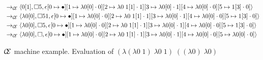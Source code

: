 \begin{figure}
\begin{align*}
&\rightarrow_{\mathcal{\mathcal{C} \mskip -4mu \mathcal{E}}}\langle 0[1],\square 5,\epsilon[0\mapsto\bullet][1\mapsto\lambda0[0]\cdot0][2\mapsto\lambda0\;1[1]\cdot1][3\mapsto\lambda0[0]\cdot1][4\mapsto\lambda0[0]\cdot0][5\mapsto1[3]\cdot0]\rangle\\ 
&\rightarrow_{\mathcal{\mathcal{C} \mskip -4mu \mathcal{E}}}\langle \lambda0[0],\square 5 1,\epsilon[0\mapsto\bullet][1\mapsto\lambda0[0]\cdot0][2\mapsto\lambda0\;1[1]\cdot1][3\mapsto\lambda0[0]\cdot1][4\mapsto\lambda0[0]\cdot0][5\mapsto1[3]\cdot0]\rangle\\ 
&\rightarrow_{\mathcal{\mathcal{C} \mskip -4mu \mathcal{E}}}\langle \lambda0[0],\square 5,\epsilon[0\mapsto\bullet][1\mapsto\lambda0[0]\cdot0][2\mapsto\lambda0\;1[1]\cdot1][3\mapsto\lambda0[0]\cdot1][4\mapsto\lambda0[0]\cdot0][5\mapsto1[3]\cdot0]\rangle\\ 
&\rightarrow_{\mathcal{\mathcal{C} \mskip -4mu \mathcal{E}}}\langle \lambda0[0],\square,\epsilon[0\mapsto\bullet][1\mapsto\lambda0[0]\cdot0][2\mapsto\lambda0\;1[1]\cdot1][3\mapsto\lambda0[0]\cdot1][4\mapsto\lambda0[0]\cdot0][5\mapsto\lambda0[0]\cdot0]\rangle
\end{align*}
\caption{$\mathcal{\mathcal{C} \mskip -4mu \mathcal{E}}$ machine example.
Evaluation of $(\lambda(\lambda0\;1)\;\lambda0\;1)\;((\lambda0)\;\lambda0)$}
\label{fig:state}
\end{figure}

